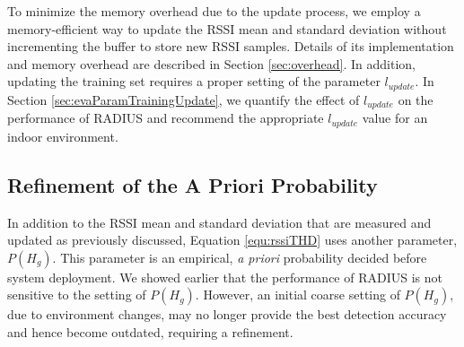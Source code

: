 To minimize the memory overhead due to the update process, we employ a memory-efficient way to update the RSSI mean and standard deviation without incrementing the buffer to store new RSSI samples. Details of its implementation and memory overhead are described in Section \ref{sec:overhead}. In addition, updating the training set requires a proper setting of the parameter $l_{update}$. In Section \ref{sec:evaParamTrainingUpdate}, we quantify the effect of $l_{update}$ on the performance of RADIUS and recommend the appropriate $l_{update}$ value for an indoor environment.


\subsection{Refinement of the A Priori Probability} \label{sec:prioriRefinement}

In addition to the RSSI mean and standard deviation that are measured and updated as previously discussed, Equation \ref{equ:rssiTHD} uses another parameter, $P(H_g)$. This parameter is an empirical, \textit{a priori} probability decided before system deployment. We showed earlier that the performance of RADIUS is not sensitive to the setting of $P(H_g)$. However, an initial coarse setting of $P(H_g)$, due to environment changes, may no longer provide the best detection accuracy and hence become outdated, requiring a refinement. 

